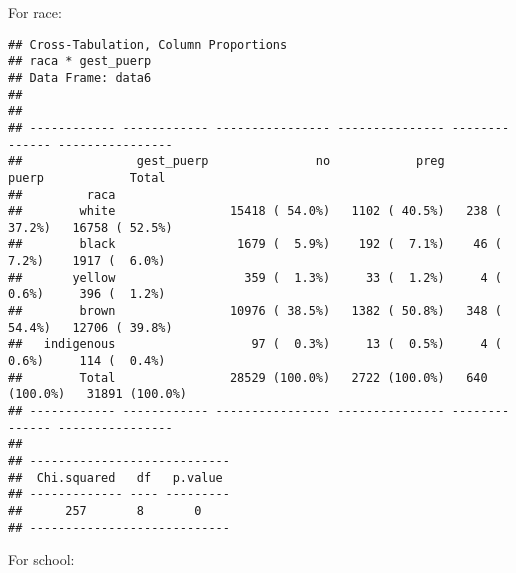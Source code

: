 \documentclass[
]{article}
\newenvironment{Shaded}{\begin{snugshade}}{\end{snugshade}}
\newcommand{\DataTypeTok}[1]{\textcolor[rgb]{0.13,0.29,0.53}{#1}}
\newcommand{\KeywordTok}[1]{\textcolor[rgb]{0.13,0.29,0.53}{\textbf{#1}}}
\newcommand{\NormalTok}[1]{#1}
\newcommand{\OperatorTok}[1]{\textcolor[rgb]{0.81,0.36,0.00}{\textbf{#1}}}
\newcommand{\OtherTok}[1]{\textcolor[rgb]{0.56,0.35,0.01}{#1}}
\newcommand{\StringTok}[1]{\textcolor[rgb]{0.31,0.60,0.02}{#1}}
\begin{document}
For race:

\begin{Shaded}
\end{Shaded}

\begin{verbatim}
## Cross-Tabulation, Column Proportions  
## raca * gest_puerp  
## Data Frame: data6  
## 
## 
## ------------ ------------ ---------------- --------------- -------------- ----------------
##                gest_puerp               no            preg          puerp            Total
##         raca                                                                              
##        white                15418 ( 54.0%)   1102 ( 40.5%)   238 ( 37.2%)   16758 ( 52.5%)
##        black                 1679 (  5.9%)    192 (  7.1%)    46 (  7.2%)    1917 (  6.0%)
##       yellow                  359 (  1.3%)     33 (  1.2%)     4 (  0.6%)     396 (  1.2%)
##        brown                10976 ( 38.5%)   1382 ( 50.8%)   348 ( 54.4%)   12706 ( 39.8%)
##   indigenous                   97 (  0.3%)     13 (  0.5%)     4 (  0.6%)     114 (  0.4%)
##        Total                28529 (100.0%)   2722 (100.0%)   640 (100.0%)   31891 (100.0%)
## ------------ ------------ ---------------- --------------- -------------- ----------------
## 
## ----------------------------
##  Chi.squared   df   p.value 
## ------------- ---- ---------
##      257       8       0    
## ----------------------------
\end{verbatim}

For school:

\begin{Shaded}
\end{Shaded}
\end{document}
